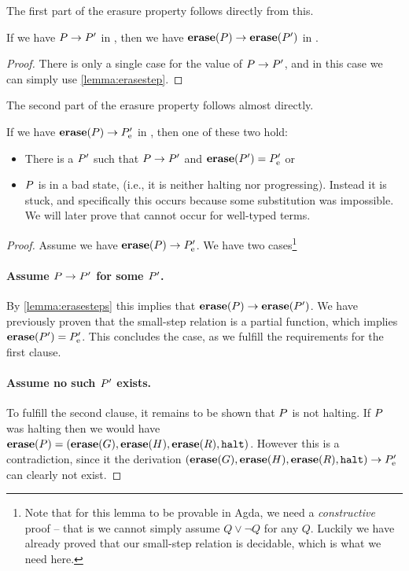The first part of the erasure property follows directly from this.

\begin{corollary}
  \label{lemma:erasesteps}
  If we have ${P} -> {P'}$ in \ATAL, then we have
  ${{\mathbf{erase}}(P)} -> {{\mathbf{erase}}(P')}$ in \ATALe.
\end{corollary}
\begin{proof}
  There is only a single case for the value of ${P} -> {P'}$, and
  in this case we can simply use \cref{lemma:erasestep}.
\end{proof}

The second part of the erasure property follows almost directly.
\begin{lemma}
  \label{lemma:erasestepsbck}
  \item If we have ${{\mathbf{erase}}(P)} -> {P'_{\mathrm{e}}}$ in \ATALe, then one of
  these two hold:
  \begin{itemize}
  \item There is a $P'$ such that ${P} -> {P'}$ and
    ${\mathbf{erase}}(P') = P'_{\mathrm{e}}$ or
  \item $P$ is in a bad state, (i.e., it is neither halting nor
    progressing). Instead it is stuck, and specifically this occurs because some
    substitution was impossible. We will later prove that cannot occur for
    well-typed terms.
  \end{itemize}
\end{lemma}
\begin{proof}
  Assume we have ${{\mathbf{erase}}(P)} -> {P'_{\mathrm{e}}}$. We have two
  cases\footnote{Note that for this lemma to be provable in Agda, we need a
    \emph{constructive} proof -- that is we cannot simply assume $Q \lor \neg Q$
    for any $Q$. Luckily we have already proved that our small-step relation is
    decidable, which is what we need here.}

  \paragraph{Assume ${P} -> {P'}$ for some $P'$.} By
  \cref{lemma:erasesteps} this implies that
  ${{\mathbf{erase}}(P)} -> {{\mathbf{erase}}(P')}$. We have previously proven that
  the small-step relation is a partial function, which implies
  ${\mathbf{erase}}(P') = P'_{\mathrm{e}}$. This concludes the case, as we fulfill the
  requirements for the first clause.

  \paragraph{Assume no such $P'$ exists.} To fulfill the second clause, it
  remains to be shown that $P$ is not halting. If $P$ was halting
  then we would have
  ${\mathbf{erase}}(P) = ({\mathbf{erase}}(G), {\mathbf{erase}}(H), {\mathbf{erase}}(R),
  \mathtt{halt})$. However this is a contradiction, since it the derivation
  ${({\mathbf{erase}}(G), {\mathbf{erase}}(H), {\mathbf{erase}}(R),
    \mathtt{halt})} -> {P'_{\mathrm{e}}}$ can clearly not exist.
\end{proof}
